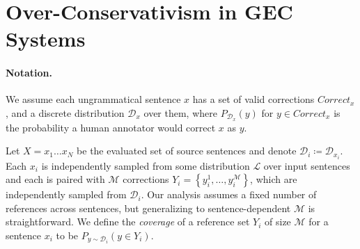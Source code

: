 \documentclass[letterpaper, 11pt]{article}
\begin{document}
%
%
%
%

\section{Over-Conservativism in GEC Systems}\label{sec:formal_conservatism}
%
%

\paragraph{Notation.}
We assume each ungrammatical sentence $x$ has a set of valid corrections $Correct_x$,
and a discrete distribution $\mathcal{D}_x$ over them, where $P_{\mathcal{D}_x}(y)$
for $y \in Correct_x$ is the probability a human annotator would correct $x$ as $y$.

Let $X=x_{1}\ldots x_{N}$ be the evaluated set of source sentences and denote $\mathcal{D}_{i}\coloneqq \mathcal{D}_{x_i}$. Each $x_{i}$ is independently sampled from some 
distribution $\mathcal{L}$ over input sentences 
and each is paired with $\mathcal{M}$ corrections $Y_i = \left\{y_{i}^{1},\ldots, y_{i}^{\mathcal{M}}\right\}$,
which are independently sampled from $\mathcal{D}_{i}$. Our analysis assumes a fixed number of references across sentences, 
but generalizing to sentence-dependent $\mathcal{M}$ is straightforward.
We define the {\it coverage} of a reference set $Y_i$ of size $\mathcal{M}$ for a sentence $x_i$ to be $P_{y \sim \mathcal{D}_i}(y \in Y_i)$.
\end{document}
